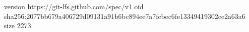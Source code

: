 version https://git-lfs.github.com/spec/v1
oid sha256:2077bb679a406729d09131a91b6bc894ee7a7fcbec6fe13349419302ce2a63a6
size 2273
